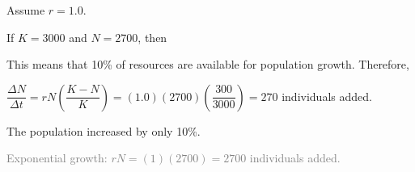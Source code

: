 \documentclass[t]{beamer}
\begin{document}
%
\begin{frame}
	\hangpara Assume $r = 1.0$.
	
	\hangpara If $K = 3000$ and $N = 2700$, \pause then
	
	
	\hangpara This means that 10\% of resources are available for population growth. \pause Therefore,
	
	\hangpara $\dfrac{\Delta N}{\Delta t} = rN\left(\dfrac{K-N}{K}\right) = (1.0)(2700)\left(\dfrac{300}{3000}\right) = 270$ individuals added. \pause
	
	\hangpara The population increased by only 10\%.
	
	\hangpara \textcolor{gray}{Exponential growth: $rN = (1)(2700) = 2700$ individuals added.}
\end{frame}
%
{
\begin{frame}
\end{frame}
}
%
\end{document}
